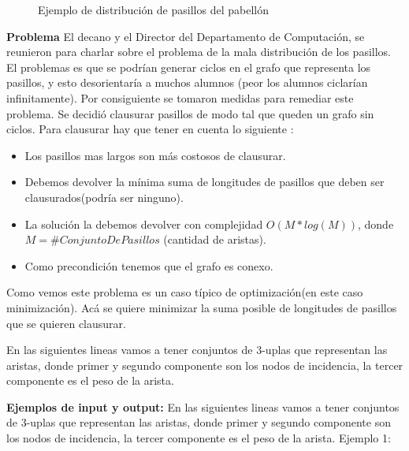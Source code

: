 \begin{figure}[H]
\begin{center}
       \caption{Ejemplo de distribución de pasillos del pabellón}
  \end{center}
\end{figure}

\textbf{Problema} \newline
El decano y el Director del Departamento de Computación, se reunieron para charlar sobre el problema de la mala distribución de los pasillos.
El problemas es que se podrían generar ciclos en el grafo que representa los pasillos, y esto desorientaría a muchos alumnos (peor los alumnos ciclarían infinitamente). Por consiguiente se tomaron medidas para remediar este problema. Se decidió clausurar pasillos de modo tal que queden un grafo sin ciclos. \newline   
Para clausurar hay que tener en cuenta lo siguiente :

\begin{itemize}  
	\item Los pasillos mas largos son más costosos de clausurar.
	\item Debemos devolver la mínima suma de longitudes de pasillos que deben ser clausurados(podría ser ninguno).
	\item La solución la debemos devolver con complejidad $O(M*log(M))$, donde  $M = \# ConjuntoDePasillos$ (cantidad de aristas).
	\item Como precondición tenemos que el grafo es conexo.
\end{itemize}
Como vemos este problema es un caso típico de optimización(en este caso minimización). Acá se quiere minimizar la suma posible de longitudes de pasillos que se quieren clausurar. \newline

En las siguientes lineas vamos a tener conjuntos de 3-uplas que representan las aristas, donde primer y segundo componente son los nodos de incidencia, la tercer componente es el peso de la arista. \newline
  
\textbf{Ejemplos de input y output: } \newline
En las siguientes lineas vamos a tener conjuntos de 3-uplas que representan las aristas, donde primer y segundo componente son los nodos de incidencia, la tercer componente es el peso de la arista.\newline
Ejemplo 1:

